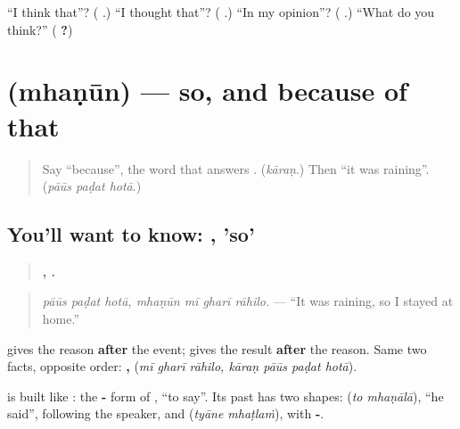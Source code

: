 \begin{tcolorbox}[breakable,colback=teal!4,colframe=teal!35!black,title={Before you move on}]
\textquotedblleft{}I think that\textquotedblright{}? (\textbf{  }.) \textquotedblleft{}I thought that\textquotedblright{}? (\textbf{  }.) \textquotedblleft{}In my opinion\textquotedblright{}? (\textbf{ }.) \textquotedblleft{}What do you think?\textquotedblright{} (\textbf{  ?})
\end{tcolorbox}
\section[\texorpdfstring{\mr{म्हणून} (mhaṇūn)}{म्हणून (mhaṇūn)}]{ (mhaṇūn) — so, and because of that}

\label{lesson:MR-C280-mhanun}



\begin{quote}
Say \textquotedblleft{}because\textquotedblright{}, the word that answers \textbf{}. (\emph{kāraṇ}.) Then \textquotedblleft{}it was raining\textquotedblright{}. (\emph{pāūs paḍat hotā}.)
\end{quote}

\subsection*{You'll want to know: , 'so'}
\begin{quote}
\textbf{  ,    .}
\end{quote}

\begin{quote}
\emph{pāūs paḍat hotā, mhaṇūn mī gharī rāhilo.} — \textquotedblleft{}It was raining, so I stayed at home.\textquotedblright{}
\end{quote}

\textbf{} gives the reason \textbf{after} the event; \textbf{} gives the result \textbf{after} the reason. Same two facts, opposite order: \textbf{  ,    } (\emph{mī gharī rāhilo, kāraṇ pāūs paḍat hotā}).

\textbf{} is built like \textbf{}: the \textbf{-} form of \textbf{}, \textquotedblleft{}to say\textquotedblright{}. Its past has two shapes: \textbf{ } (\emph{to mhaṇālā}), \textquotedblleft{}he said\textquotedblright{}, following the speaker, and \textbf{ } (\emph{tyāne mhaṭlaṁ}), with \textbf{-}.

